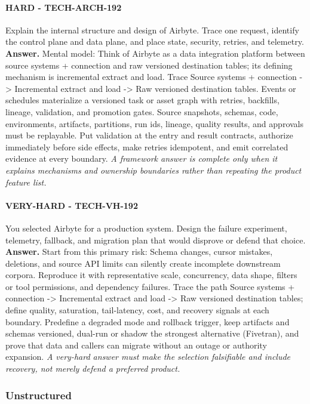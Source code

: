\paragraph{HARD - TECH-ARCH-192} Explain the internal structure and design of Airbyte. Trace one request, identify the control plane and data plane, and place state, security, retries, and telemetry.
\textbf{Answer.} Mental model: Think of Airbyte as a data integration platform between source systems + connection and raw versioned destination tables; its defining mechanism is incremental extract and load. Trace Source systems + connection -> Incremental extract and load -> Raw versioned destination tables. Events or schedules materialize a versioned task or asset graph with retries, backfills, lineage, validation, and promotion gates. Source snapshots, schemas, code, environments, artifacts, partitions, run ids, lineage, quality results, and approvals must be replayable. Put validation at the entry and result contracts, authorize immediately before side effects, make retries idempotent, and emit correlated evidence at every boundary.
\textit{A framework answer is complete only when it explains mechanisms and ownership boundaries rather than repeating the product feature list.}
\paragraph{VERY-HARD - TECH-VH-192} You selected Airbyte for a production system. Design the failure experiment, telemetry, fallback, and migration plan that would disprove or defend that choice.
\textbf{Answer.} Start from this primary risk: Schema changes, cursor mistakes, deletions, and source API limits can silently create incomplete downstream corpora. Reproduce it with representative scale, concurrency, data shape, filters or tool permissions, and dependency failures. Trace the path Source systems + connection -> Incremental extract and load -> Raw versioned destination tables; define quality, saturation, tail-latency, cost, and recovery signals at each boundary. Predefine a degraded mode and rollback trigger, keep artifacts and schemas versioned, dual-run or shadow the strongest alternative (Fivetran), and prove that data and callers can migrate without an outage or authority expansion.
\textit{A very-hard answer must make the selection falsifiable and include recovery, not merely defend a preferred product.}
\subsubsection*{Unstructured}
